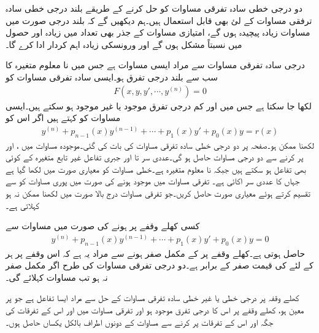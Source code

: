 دو درجی خطی سادہ تفرقی مساوات کو حل کرنے کے طریقے بلند درجی خطی سادہ ترفقی مساوات کے لئ بھی قابل استعمال ہیں۔ہم دیکھیں گے کہ بلند درجی صورت میں مساوات زیادہ پیچیدہ ہوں گے،  امتیازی مساوات کے جذر بھی تعداد میں زیادہ اور حصول میں نسبتاً مشکل ہوں گے اور ورونسکی زیادہ اہم کردار ادا کرے گا۔ 

 درجی سادہ تفرقی مساوات سے مراد ایسی مساوات ہے جس میں نا معلوم متغیرہ  کا  سب سے بلند درجی تفرق ہو۔ایسی سادہ تفرقی مساوات کو
\begin{align*}
F(x,y,y',\cdots, y^{(n)})=0
\end{align*}
لکھا جا سکتا ہے جس میں  اور کم درجی تفرق موجود یا غیر موجود ہو سکتے ہیں۔ایسی مساوات کو  کہتے ہیں اگر اس کو 
\begin{align}\label{مساوات_سادہ_بلند_خطی_الف}
y^{(n)}+p_{n-1}(x)y^{(n-1)}+\cdots+p_1(x)y'+p_0(x)y=r(x)
\end{align}
لکھنا ممکن ہو۔صفحہ  پر دو درجی خطی سادہ تفرقی مساوات کی بات کی گئی۔موجودہ مساوات میں ،  اور  پر کرنے سے دو درجی مساوات حاصل ہو گی۔عددی سر  تا   اور جبری تفاعل  غیر تابع متغیرہ   کے کوئی بھی تفاعل ہو سکتے ہیں جبکہ  نا معلوم متغیرہ ہے۔خطی مساوات کو معیاری صورت میں لکھا گیا ہے جہاں  کا عددی سر اکائی  ہے۔ تفرقی مساوات میں   موجود ہونے کی صورت میں پوری مساوات کو  سے تقسیم کرتے ہوئے معیاری صورت حاصل کریں۔جو تفرقی مساوات درج بالا صورت میں لکھنا ممکن نہ ہو  کہلاتی ہے۔

کسی کھلے وقفے  پر    ہونے کی صورت میں  مساوات  سے 
\begin{align}\label{مساوات_سادہ_بلند_خطی_ب}
y^{(n)}+p_{n-1}(x)y^{(n-1)}+\cdots+p_1(x)y'+p_0(x)y=0
\end{align}
حاصل ہوتی ہے۔کھلے وقفے پر  کے مکمل صفر ہونے سے مراد یہ ہے کہ اس وقفے پر ہر  کے لئے  کی قیمت صفر کے برابر ہے۔دو درجی تفرقی مساوات کی طرح  اگر  مکمل صفر نہ ہو تب مساوات  کہلائے گی۔

کھلے وقفہ  پر  درجی خطی یا غیر خطی سادہ تفرقی مساوات کے حل  سے مراد ایسا تفاعل ہے جو  پر معین ہو،  کھلے وقفے پر اس کا  درجی تفرق موجود ہو اور تفرقی مساوات میں  اور اس کے تفرقات کی جگہ  اور اس کے تفرقات پر کرنے سے مساوات کے دونوں اطراف بالکل یکساں حاصل ہوں۔ 

